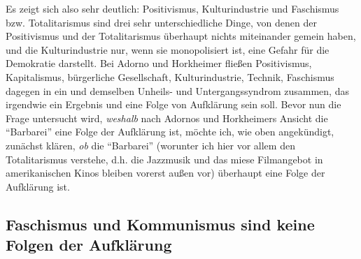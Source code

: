 \documentclass[12pt,a4paper,ngerman]{article}
\begin{document}
Es zeigt sich also sehr deutlich: Positivismus, Kulturindustrie und Faschismus
bzw. Totalitarismus sind drei sehr unterschiedliche Dinge, von denen der
Positivismus und der Totalitarismus überhaupt nichts miteinander gemein haben,
und die Kulturindustrie nur, wenn sie monopolisiert ist, eine Gefahr für die
Demokratie darstellt. Bei Adorno und Horkheimer fließen Positivismus,
Kapitalismus, bürgerliche Gesellschaft, Kulturindustrie, Technik, Faschismus
dagegen in ein und demselben Unheils- und Untergangssyndrom zusammen, das
irgendwie ein Ergebnis und eine Folge von Aufklärung sein soll. Bevor nun die
Frage untersucht wird, {\em weshalb} nach Adornos und Horkheimers Ansicht die
"`Barbarei"' eine Folge der Aufklärung ist, möchte ich, wie oben angekündigt,
zunächst klären, {\em ob} die "`Barbarei"' (worunter ich hier vor allem den
Totalitarismus verstehe, d.h. die Jazzmusik und das miese Filmangebot in
amerikanischen Kinos bleiben vorerst außen vor) überhaupt eine Folge der
Aufklärung ist.

\subsection{Faschismus und Kommunismus sind keine Folgen der Aufklärung}
\end{document}
